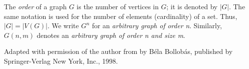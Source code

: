 \documentclass[12pt]{article}
\begin{document}
The \emph{order} of a graph $G$ is the number of vertices in $G$; it is denoted by $|G|$. The same notation is used for the number of elements (cardinality) of a set. Thus, $|G| = |V(G)|$. We write $G^n$ for an \emph{arbitrary graph of order n}. Similarly, $G(n,m)$ denotes an \emph{arbitrary graph of order n and size m}.


\footnotesize{Adapted with permission of the author from \emph{} by B\'{e}la Bollob\'{a}s, published by Springer-Verlag New York, Inc., 1998.}
\end{document}
